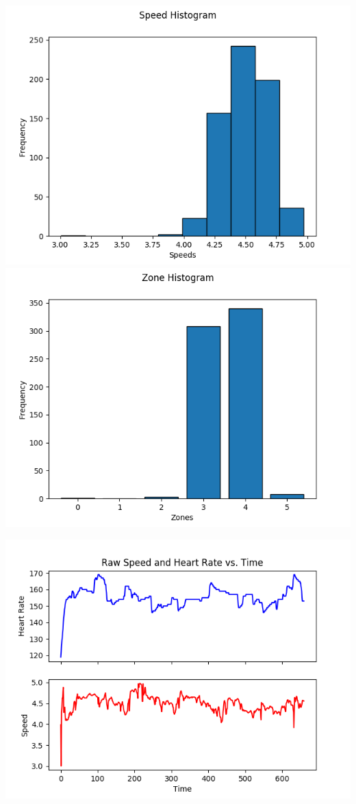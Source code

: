 \documentclass{article}
\begin{document}
\begin{center}
\includegraphics[scale=0.4]{histograms/pace_histogram_2018_05_10_Steve_Moors.png}
\hspace{0.5in}
\includegraphics[scale=0.4]{histograms/zone_histogram_2018_05_10_Steve_Moors.png}
\end{center}
\begin{center}
\includegraphics[scale=0.8]{plots/speed_heart_rate_raw_2018_05_10_Steve_Moors.png}
\end{center}
\end{document}
